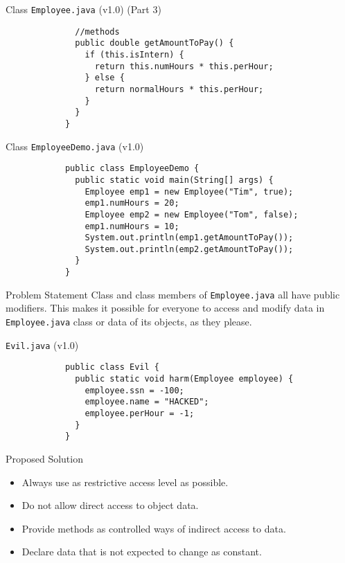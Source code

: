 \documentclass[10pt, compress]{beamer}
\begin{document}
\begin{slide}
	\begin{block}{Class \texttt{Employee.java} (v1.0) (Part 3)}
		\begin{verbatim}
			  //methods
			  public double getAmountToPay() {
			    if (this.isIntern) {
			      return this.numHours * this.perHour;
			    } else {
			      return normalHours * this.perHour;
			    }
			  }
			}
		\end{verbatim}
	\end{block}
\end{slide}

\begin{slide}
	\begin{block}{Class \texttt{EmployeeDemo.java} (v1.0)}
		\begin{verbatim}
			public class EmployeeDemo {
			  public static void main(String[] args) {
			    Employee emp1 = new Employee("Tim", true);
			    emp1.numHours = 20;
			    Employee emp2 = new Employee("Tom", false);
			    emp1.numHours = 10;
			    System.out.println(emp1.getAmountToPay());
			    System.out.println(emp2.getAmountToPay());
			  }
			}
		\end{verbatim}
	\end{block}
\end{slide}

\begin{slide}
	\begin{block}{Problem Statement}
		Class and class members of \texttt{Employee.java} all have public modifiers.
		This makes it possible for everyone to access and modify data in \texttt{Employee.java} class or data of its objects, as they please.
	\end{block}
	\begin{block}{\texttt{Evil.java} (v1.0)}
		\begin{verbatim}
			public class Evil {
			  public static void harm(Employee employee) {
			    employee.ssn = -100;
			    employee.name = "HACKED";
			    employee.perHour = -1;
			  }
			}
		\end{verbatim}
	\end{block}
\end{slide}

\begin{slide}
	\begin{block}{Proposed Solution}
		\begin{itemize}
			\item[] Always use as restrictive access level as possible.
			\item[] Do not allow direct access to object data.
			\item[] Provide methods as controlled ways of indirect access to data.
			\item[] Declare data that is not expected to change as constant.
		\end{itemize}
	\end{block}
\end{slide}
\end{document}
